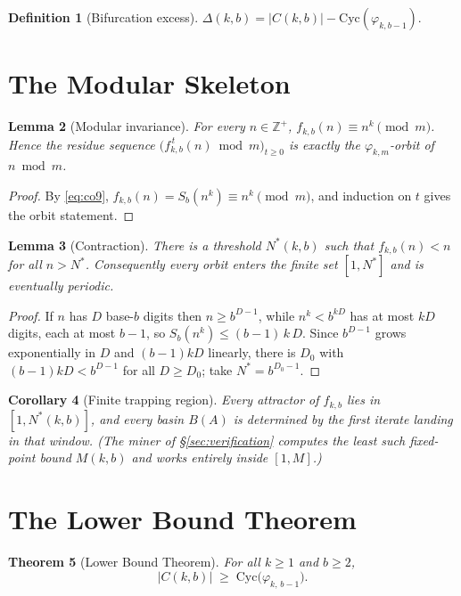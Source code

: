 \documentclass[11pt]{article}
\newtheorem{theorem}{Theorem}[section]
\newtheorem{lemma}[theorem]{Lemma}
\newtheorem{corollary}[theorem]{Corollary}
\theoremstyle{definition}
\newtheorem{definition}[theorem]{Definition}
\theoremstyle{remark}
\newcommand{\Cyc}{\mathrm{Cyc}}
\begin{document}
\begin{definition}[Bifurcation excess]
$\Delta(k,b) = |C(k,b)| - \Cyc(\varphi_{k,b-1})$.
\end{definition}

\section{The Modular Skeleton}

\begin{lemma}[Modular invariance]\label{lem:inv}
For every $n \in \mathbb{Z}^+$, $f_{k,b}(n) \equiv n^k \pmod{m}$. Hence the residue sequence $\big(f_{k,b}^{\,t}(n) \bmod m\big)_{t\ge 0}$ is exactly the $\varphi_{k,m}$-orbit of $n \bmod m$.
\end{lemma}

\begin{proof}
By \eqref{eq:co9}, $f_{k,b}(n) = S_b(n^k) \equiv n^k \pmod m$, and induction on $t$ gives the orbit statement.
\end{proof}

\begin{lemma}[Contraction]\label{lem:contraction}
There is a threshold $N^*(k,b)$ such that $f_{k,b}(n) < n$ for all $n > N^*$. Consequently every orbit enters the finite set $[1, N^*]$ and is eventually periodic.
\end{lemma}

\begin{proof}
If $n$ has $D$ base-$b$ digits then $n \ge b^{D-1}$, while $n^k < b^{kD}$ has at most $kD$ digits, each at most $b-1$, so $S_b(n^k) \le (b-1)\,k\,D$. Since $b^{D-1}$ grows exponentially in $D$ and $(b-1)kD$ linearly, there is $D_0$ with $(b-1)kD < b^{D-1}$ for all $D \ge D_0$; take $N^* = b^{D_0 - 1}$.
\end{proof}

\begin{corollary}[Finite trapping region]\label{cor:trap}
Every attractor of $f_{k,b}$ lies in $[1, N^*(k,b)]$, and every basin $B(A)$ is determined by the first iterate landing in that window. (The miner of \S\ref{sec:verification} computes the least such fixed-point bound $M(k,b)$ and works entirely inside $[1,M]$.)
\end{corollary}

\section{The Lower Bound Theorem}\label{sec:lb}

\begin{theorem}[Lower Bound Theorem]\label{thm:lb}
For all $k \ge 1$ and $b \ge 2$,
\[
|C(k,b)| \;\ge\; \Cyc\big(\varphi_{k,\,b-1}\big).
\]
\end{theorem}
\end{document}
